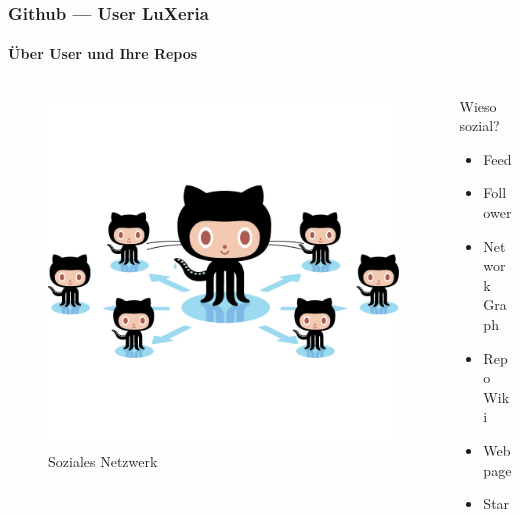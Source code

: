 \begin{frame}
	\frametitle{Github --- User \hfill{} LuXeria}
	\framesubtitle{Über User und Ihre Repos}
	\begin{columns}
		\begin{column}{5cm}
			\begin{figure}
			\includegraphics[scale=0.1]{github_social.jpg}
			\caption{Soziales Netzwerk}
			\end{figure}
		\end{column}
		\begin{column}{5cm}
			\begin{block}{Wieso sozial?}
				\begin{itemize}
					\item Feed
					\item Follower
					\item Network Graph
					\item Repo Wiki
					\item Webpage
					\item Star
				\end{itemize}
			\end{block}
		\end{column}
	\end{columns}
\end{frame}
